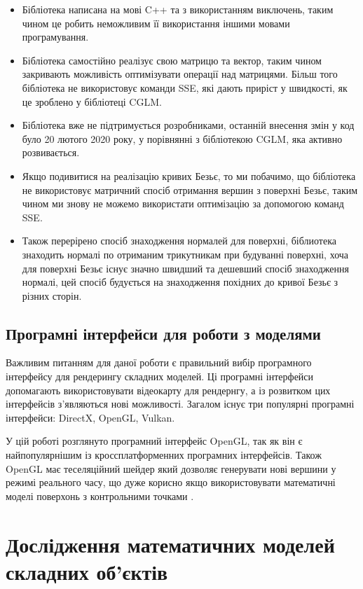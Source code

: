 \let\mypdfximage\pdfximage\def\pdfximage{\immediate\mypdfximage}\documentclass[14pt,a4paper]{extarticle}
\theoremstyle{definition}
\renewcommand{\[}{\begin{singlespace}\begin{equation*}}
\renewcommand{\]}{\end{equation*}\end{singlespace}}
\renewcommand{\+}{\discretionary{\mbox{\scriptsize$\hookleftarrow$}}{}{}}
\begin{document}
\begin{itemize}
\item Бібліотека написана на мові C++ та з використанням виключень, таким чином це робить неможливим її використання іншими мовами програмування.
\item Бібліотека самостійно реалізує свою матрицю та вектор, таким чином закривають можливість оптимізувати операції над матрицями. Більш того бібліотека не  використовує команди SSE, які дають приріст у швидкості, як це зроблено у бібліотеці CGLM.
\item Бібліотека вже не підтримується розробниками, останній внесення змін у код було 20 лютого 2020 року, у порівнянні з бібліотекою CGLM, яка активно розвивається.
\item Якщо подивитися на реалізацію кривих Безьє, то ми побачимо, що бібліотека не використовує матричний спосіб отримання вершин з поверхні Безьє, таким чином ми знову не можемо використати оптимізацію за допомогою команд SSE.
\item Також перерірено спосіб знаходження нормалей для поверхні, біблиотека знаходить нормалі по отриманим трикутникам при будуванні поверхні, хоча для поверхні Безьє існує значно швидший та дешевший спосіб знаходження нормалі, цей спосіб будується на знаходження похідних до кривої Безьє з різних сторін.
\end{itemize}

\subsection{Програмні інтерфейси для роботи з моделями}

Важливим питанням для даної роботи є правильний вибір програмного інтерфейсу для рендерингу складних моделей. Ці програмні інтерфейси допомагають використовувати відеокарту для рендернгу, а із розвитком цих інтерфейсів з'являються нові можливості. Загалом існує три популярні програмні інтерфейси: DirectX, OpenGL, Vulkan.

У цій роботі розглянуто програмний інтерфейс OpenGL, так як він є найпопулярнішим із кроссплатформенних програмних інтерфейсів. Також OpenGL має теселяційний шейдер \cite{Tessellation} який дозволяє генерувати нові вершини у режимі реального часу, що дуже корисно якщо використовувати математичні моделі поверхонь з контрольними точками \cite{tesselation-tutorial}. 

\section{Дослідження математичних моделей складних об'єктів}
\end{document}
